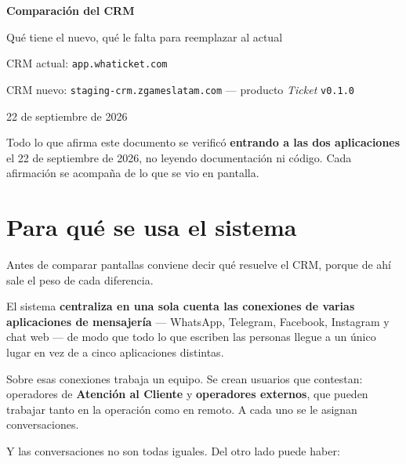 \documentclass[11pt,a4paper]{article}
\newcommand{\cod}[1]{\texttt{\small #1}}
\begin{document}
\begin{titlepage}
\centering
\vspace*{3cm}
{\Huge\bfseries\color{primary} Comparación del CRM\par}
\vspace{0.6cm}
{\Large\color{gray70} Qué tiene el nuevo, qué le falta para reemplazar al actual\par}
\vspace{2cm}
{\large CRM actual: \cod{app.whaticket.com}\par}
\vspace{0.3cm}
{\large CRM nuevo: \cod{staging-crm.zgameslatam.com} --- producto \emph{Ticket} \cod{v0.1.0}\par}
\vspace{0.4cm}
{\large 22 de septiembre de 2026\par}
\vfill
\begin{minipage}{0.82\textwidth}
\small\color{gray70}
Todo lo que afirma este documento se verificó \textbf{entrando a las dos
aplicaciones} el 22 de septiembre de 2026, no leyendo documentación ni código. Cada
afirmación se acompaña de lo que se vio en pantalla.
\end{minipage}
\vspace{2cm}
\end{titlepage}

\tableofcontents
\newpage

\section{Para qué se usa el sistema}
\label{sec:antecedente}

Antes de comparar pantallas conviene decir qué resuelve el CRM, porque de ahí sale el
peso de cada diferencia.

El sistema \textbf{centraliza en una sola cuenta las conexiones de varias aplicaciones de
mensajería} --- WhatsApp, Telegram, Facebook, Instagram y chat web --- de modo que todo
lo que escriben las personas llegue a un único lugar en vez de a cinco aplicaciones
distintas.

Sobre esas conexiones trabaja un equipo. Se crean usuarios que contestan: operadores de
\textbf{Atención al Cliente} y \textbf{operadores externos}, que pueden trabajar tanto en
la operación como en remoto. A cada uno se le asignan conversaciones.

Y las conversaciones no son todas iguales. Del otro lado puede haber:
\end{document}
